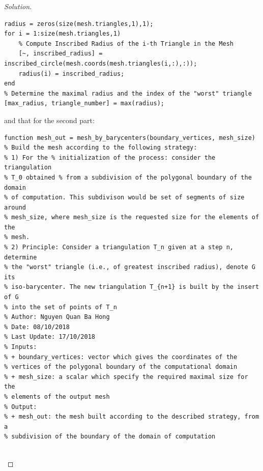 \documentclass[11pt,a4paper,center,notitlepage]{article}
\numberwithin{equation}{section}
\begin{document}
\begin{proof}[Solution]
\begin{verbatim}
radius = zeros(size(mesh.triangles,1),1);
for i = 1:size(mesh.triangles,1)
    % Compute Inscribed Radius of the i-th Triangle in the Mesh
    [~, inscribed_radius] = inscribed_circle(mesh.coords(mesh.triangles(i,:),:));
    radius(i) = inscribed_radius;
end
% Determine the maximal radius and the index of the "worst" triangle
[max_radius, triangle_number] = max(radius);
\end{verbatim}
and that for the second part:
\begin{verbatim}
function mesh_out = mesh_by_barycenters(boundary_vertices, mesh_size)
% Build the mesh according to the following strategy:
% 1) For the % initialization of the process: consider the triangulation
% T_0 obtained % from a subdivision of the polygonal boundary of the domain
% of computation. This subdivison would be set of segments of size around
% mesh_size, where mesh_size is the requested size for the elements of the
% mesh.
% 2) Principle: Consider a triangulation T_n given at a step n, determine
% the "worst" triangle (i.e., of greatest inscribed radius), denote G its
% iso-barycenter. The new triangulation T_{n+1} is built by the insert of G
% into the set of points of T_n
% Author: Nguyen Quan Ba Hong
% Date: 08/10/2018
% Last Update: 17/10/2018
% Inputs:
% + boundary_vertices: vector which gives the coordinates of the
% vertices of the polygonal boundary of the computational domain
% + mesh_size: a scalar which specify the required maximal size for the
% elements of the output mesh
% Output:
% + mesh_out: the mesh built according to the described strategy, from a
% subdivision of the boundary of the domain of computation


\end{verbatim}
\end{proof}
\end{document}
